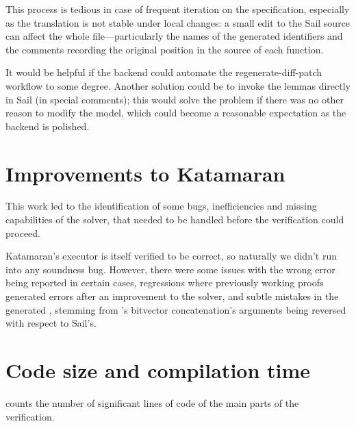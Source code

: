 This process is tedious in case of frequent iteration on the specification, especially as the translation is not stable under local changes: a small edit to the Sail source can affect the whole \usail file---particularly the names of the generated identifiers and the comments recording the original position in the source of each \usail function.

It would be helpful if the backend could automate the regenerate-diff-patch workflow to some degree. Another solution could be to invoke the lemmas directly in Sail (\eg in special comments); this would solve the problem if there was no other reason to modify the \usail model, which could become a reasonable expectation as the backend is polished.

\section{Improvements to Katamaran}

This work led to the identification of some bugs, inefficiencies and missing capabilities of the solver, that needed to be handled before the verification could proceed.

Katamaran's executor is itself verified to be correct, so naturally we didn't run into any soundness bug. However, there were some issues with the wrong error being reported in certain cases, regressions where previously working proofs generated errors after an improvement to the solver, and subtle mistakes in the generated \usail, stemming \eg from \usail's bitvector concatenation's arguments being reversed with respect to Sail's.

\section{Code size and compilation time}

 counts the number of significant lines of code of the main parts of the \msp verification.

